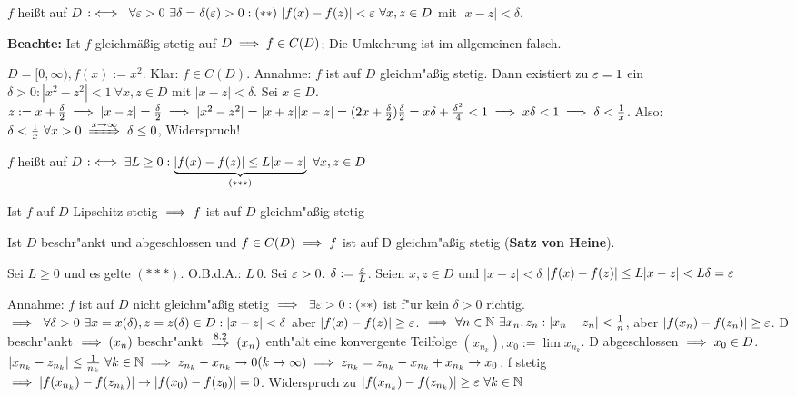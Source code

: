\documentclass[a4paper,twoside,DIV15,BCOR12mm]{scrbook}
\begin{document}
\begin{definition}
$f$ heißt auf $D$  $:\iff\ \forall \varepsilon>0\ \exists \delta=\delta(\varepsilon)>0: (**)\ |f(x)-f(z)| < \varepsilon\ \forall x,z \in D$ mit $|x-z|<\delta.$
\end{definition}

\textbf{Beachte:} Ist $f$ gleichmäßig stetig auf $D \implies f \in C(D)$; Die Umkehrung ist im allgemeinen falsch.

\begin{beispiel}
$D=[0, \infty), f(x):=x^2$. Klar: $f \in C(D)$. Annahme: $f$ ist auf $D$ gleichm"aßig stetig. Dann existiert zu $\varepsilon=1$ ein $\delta>0: |x^2-z^2|<1\ \forall x,z \in D$ mit $|x-z|<\delta$. Sei $x \in D$. $z:=x+\frac{\delta}{2} \implies |x-z|=\frac{\delta}{2} \implies |x^2-z^2|=|x+z||x-z|=(2x + \frac{\delta}{2})\frac{\delta}{2}=x\delta + \frac{\delta^2}{4}<1 \implies x\delta<1 \implies \delta<\frac{1}{x}$. Also: $\delta<\frac{1}{x}\ \forall x>0 \folgtwegen{x\to\infty} \delta \le 0$, Widerspruch!
\end{beispiel}

\begin{definition}
$f$ heißt auf $D$  $:\iff \exists L\ge 0: \underbrace{|f(x)-f(z)|\le L|x-z|}_{(***)}\ \forall x,z \in D$
\end{definition}

\begin{satz}[Stetigkeitsstätze]
\begin{liste}
\item Ist $f$ auf $D$ Lipschitz stetig $\implies f$ ist auf $D$ gleichm"aßig stetig
\item Ist $D$ beschr"ankt und abgeschlossen und $f\in C(D) \implies f$ ist auf D gleichm"aßig stetig (\textbf{Satz von Heine}).
\end{liste}
\end{satz}

\begin{beweise}
\item Sei $L\ge 0$ und es gelte $(***)$. O.B.d.A.: $L\> 0$. Sei $\varepsilon>0$. $\delta:=\frac{\varepsilon}{L}$. Seien $x, z \in D$ und $|x-z|<\delta$ \folgt $|f(x)-f(z)| \le L|x-z|<L\delta=\varepsilon$
\item Annahme: $f$ ist auf $D$ nicht gleichm"aßig stetig $\implies \ \exists \varepsilon>0: (**)$ ist f"ur kein $\delta>0$ richtig. $\implies \ \forall\delta>0\ \exists x=x(\delta),z=z(\delta) \in D: |x-z|<\delta$ aber $|f(x)-f(z)|\ge \varepsilon$. $\implies \forall n \in \mathbb{N}\ \exists x_n, z_n: |x_n-z_n|<\frac{1}{n}$, aber $|f(x_n)-f(z_n)| \ge \varepsilon$. D beschr"ankt $\implies (x_n)$ beschr"ankt $\folgtnach{8.2} (x_n) $ enth"alt eine konvergente Teilfolge $(x_{n_k}), x_0:=\lim x_{n_k}$. D abgeschlossen $\implies x_0 \in D$. $|x_{n_k}-z_{n_k}| \le \frac{1}{n_k}\ \forall k \in \mathbb{N} \implies z_{n_k} - x_{n_k} \to 0 (k \to \infty) \implies z_{n_k} = z_{n_k} - x_{n_k} + x_{n_k} \to x_0$. f stetig $\implies |f(x_{n_k})-f(z_{n_k})| \to |f(x_0)-f(z_0)|=0$. Widerspruch zu $|f(x_{n_k})-f(z_{n_k})|\ge \varepsilon \ \forall k \in \mathbb{N}$
\end{beweise}
\end{document}
